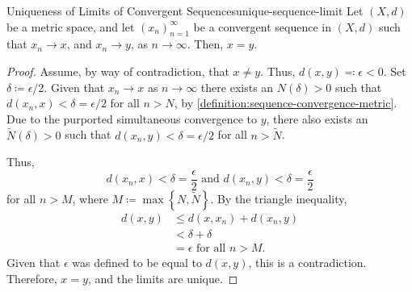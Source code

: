 \documentclass{article}
\numberwithin{equation}{section}
\numberwithin{figure}{section}
\begin{document}
\begin{theorem}{Uniqueness of Limits of Convergent
        Sequences}{unique-sequence-limit}
    Let $ (X, d) $ be a metric space, and let $ \left( x_n \right)_{n=1}^\infty
    $ be a convergent sequence in $ (X, d) $ such that $ x_n \to x $, and $ x_n
    \to y $, as $ n \to \infty $. Then, $ x = y $.
    \begin{proof}
        Assume, by way of contradiction, that $ x \neq y $. Thus, $ d(x, y)
        \eqcolon \epsilon < 0 $. Set $ \delta \coloneq \epsilon/2 $. Given that
        $ x_n \to x $ as $ n \to \infty $ there exists an $ N(\delta) > 0 $ such
        that $ d(x_n, x) < \delta = \epsilon/2 $ for all $ n > N $, by
        \cref{definition:sequence-convergence-metric}. Due to the purported
        simultaneous convergence to $ y $, there also exists an $
        \widetilde{N}(\delta) > 0 $ such that $ d(x_n, y) < \delta = \epsilon/2
        $ for all $ n > \widetilde{N} $.

        Thus,
        \begin{equation}
            d(x_n, x) < \delta = \frac{\epsilon}{2} \text{ and }
            d(x_n, y) < \delta = \frac{\epsilon}{2}
        \end{equation}
        for all $ n > M $, where $ M \coloneq \max\left\{ N, \widetilde{N}
        \right\} $. By the triangle inequality,
        \begin{align}
            d(x, y) &\leq d(x, x_n) + d(x_n, y) \\
            &< \delta + \delta \\
            &= \epsilon \text{ for all } n > M.
        \end{align}
        Given that $ \epsilon $ was defined to be equal to $ d(x, y) $, this is
        a contradiction. Therefore, $ x = y $, and the limits are unique.
    \end{proof}
    \centering
\end{theorem}
\end{document}
